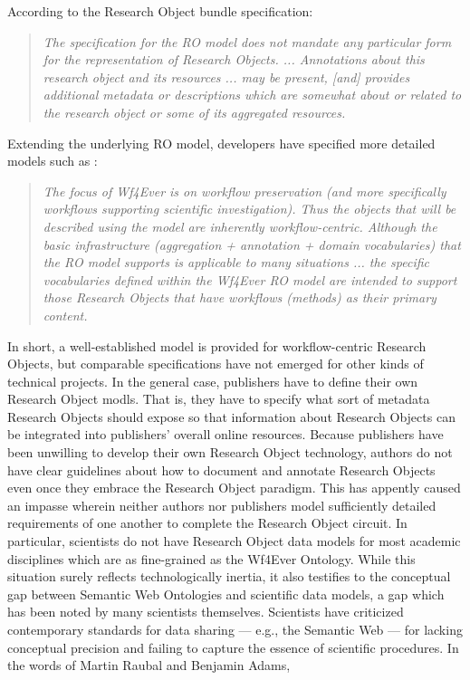 \documentclass[11pt,letterpaper]{article}
\begin{document}
According to the Research Object bundle specification: 

\begin{quote}{\textit{The specification for the RO model does not mandate any 
particular form for the representation of Research Objects. 
... Annotations about this research object and its resources ... 
may be present, [and] provides additional metadata or descriptions 
which are somewhat about or related to the research object or some 
of its aggregated resources.}}
\end{quote}

Extending the underlying RO model, developers have 
specified more detailed models such as :

\begin{quote}{\textit{The focus of Wf4Ever is on workflow preservation 
(and more specifically workflows supporting scientific investigation). 
Thus the objects that will be described using the model are inherently 
workflow-centric.  Although the basic infrastructure 
(aggregation + annotation + domain vocabularies) that the RO model supports 
is applicable to many situations ...  
the specific vocabularies defined within the Wf4Ever RO model are 
intended to support those Research Objects that 
have workflows (methods) as their primary content.}}
\end{quote}

In short, a well-established model is provided for workflow-centric 
Research Objects, but comparable specifications have not 
emerged for other kinds of technical projects.  In the general 
case, publishers have to define their own Research Object 
modls.  That is, they have to specify what sort of 
metadata Research Objects should expose so that 
information about Research Objects can be integrated 
into publishers' overall online resources.  
\p{}
Because publishers have been unwilling to develop their own 
Research Object technology, authors do not have clear 
guidelines about how to document and annotate Research Objects 
even once they embrace the Research Object paradigm.  
This has appently caused an impasse wherein 
neither authors nor publishers model sufficiently detailed 
requirements of one another to complete the Research Object 
circuit.  In particular, scientists do not have 
Research Object data models for most academic disciplines 
which are as fine-grained as the Wf4Ever Ontology.  
While this situation surely reflects technologically 
inertia, it also testifies to the conceptual gap between 
Semantic Web Ontologies and scientific data models, a gap 
which has been noted by many scientists themselves.  
\p{}
Scientists have criticized contemporary standards for data sharing 
--- e.g., the Semantic Web --- for lacking conceptual precision 
and failing to capture the essence of scientific 
procedures.  In the words of 
Martin Raubal and Benjamin Adams,
\end{document}
